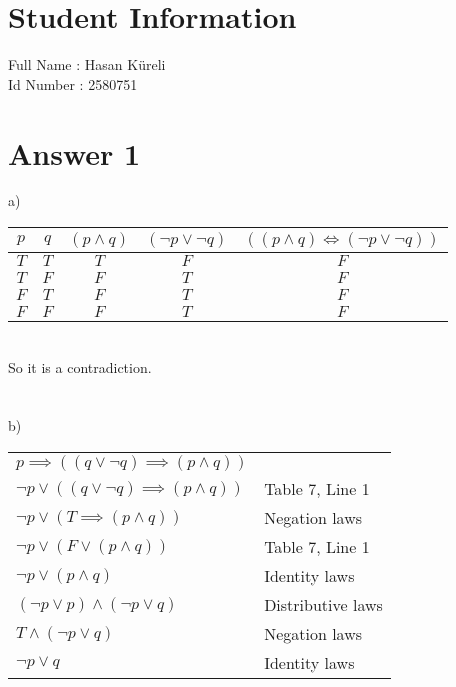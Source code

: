 \documentclass[12pt]{article}
\begin{document}
\section*{Student Information } 
Full Name :  Hasan Küreli\\
Id Number :  2580751\\

\section*{Answer 1}

a)
\begin{tabular}{|c|c|c|c|c|}
\hline
     $p$ & $q$ & $(p\wedge q)$ & $(\neg p \vee \neg q)$ &  $((p\wedge q) \iff (\neg p \vee \neg q))$\\
\hline
    $T$ & $T$ & $T$ & $F$ & $F$\\
\hline
    $T$ & $F$ & $F$ & $T$ & $F$\\
\hline
    $F$ & $T$ & $F$ & $T$ & $F$\\
\hline
    $F$ & $F$ & $F$ & $T$ & $F$\\
\hline

\end{tabular}\\

So it is a contradiction.\\\\\\
b)
\begin{tabular}{ll}
    $ p \implies ( (q \vee \neg q) \implies (p \wedge q)) $ &  \\
    $\neg p  \vee  ( (q \vee \neg q) \implies (p \wedge q)) $ & Table 7, Line 1 \\
    $\neg p  \vee  ( T \implies (p \wedge q)) $ & Negation laws \\
    $\neg p  \vee  ( F \vee (p \wedge q)) $ & Table 7, Line 1 \\
    $\neg p  \vee  (p \wedge q) $ & Identity laws\\
    $(\neg p \vee p) \wedge (\neg p \vee q)$ & Distributive laws\\
    $T \wedge (\neg p \vee q)$ & Negation laws\\
    $\neg p \vee q$ & Identity laws\\
\end{tabular}
\end{document}
